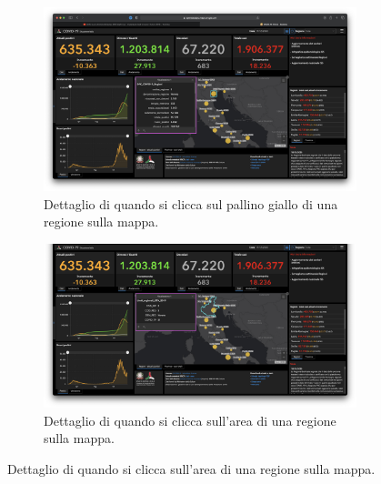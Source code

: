 \begin{enumerate}
        \begin{figure}[H]
            \centering
            \begin{subfigure}[b]{0.5\columnwidth}
                \includegraphics[width=\columnwidth]{../../../assets/images/verifica-risorse-esistenti/guidelines_violations_10.png}
                \caption{Dettaglio di quando si clicca sul pallino giallo di una regione sulla mappa.}
            \end{subfigure}
            
            \begin{subfigure}[b]{0.5\columnwidth}
                \includegraphics[width=\columnwidth]{../../../assets/images/verifica-risorse-esistenti/guidelines_violations_11.png}
                \caption{Dettaglio di quando si clicca sull'area di una regione sulla mappa.}
            \end{subfigure}


\end{figure}
\end{enumerate}
